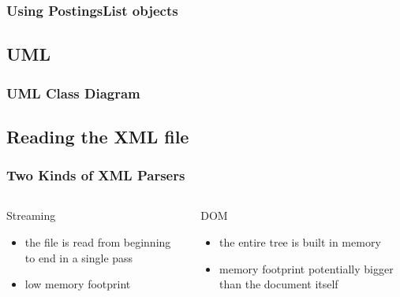 \documentclass{beamer}
\begin{document}

\begin{frame}
  \frametitle{Using PostingsList objects}

  \begin{example}
    \lstPostingsList
  \end{example}
\end{frame}


\subsection{UML}

\begin{frame}
  \frametitle{UML Class Diagram}
  \begin{figure}[htbp]
    \centering
    
  \end{figure}
\end{frame}

\subsection{Reading the XML file}

\begin{frame}
  \frametitle{Two Kinds of XML Parsers}

  \begin{columns}
    \begin{block}{Streaming}
      \begin{itemize}
        \item the file is read from beginning to end in a single pass
        \item low memory footprint
      \end{itemize}
    \end{block}
    \begin{block}{DOM}
      \begin{itemize}
      \item the entire tree is built in memory
      \item memory footprint potentially bigger than the document itself
      \end{itemize}
    \end{block}
  \end{columns}
\end{frame}
\end{document}
